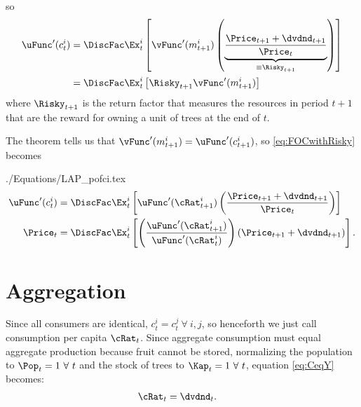 \documentclass{\handout}
\begin{document}
so\hypertarget{FOCwithRisky}{}
\begin{equation}\begin{gathered}\begin{aligned}
 \uFunc^{\prime}(c_{t}^{i}) & =  \DiscFac \Ex_{t}^{i}\left[\vFunc^{\prime}({m}_{t+1}^{i})\left(\underbrace{\frac{{\Price}_{t+1}+\dvdnd_{t+1}}{\Price_{t}}}_{\equiv \Risky_{t+1}}\right)\right] \label{eq:FOCwithRisky}
\\  & =  \DiscFac \Ex_{t}^{i}\left[\Risky_{t+1} \vFunc^{\prime}({m}_{t+1}^{i})\right] 
\end{aligned}\end{gathered}\end{equation}
where $\Risky_{t+1}$ is the return factor that measures the resources in period $t+1$ that are the reward for 
owning a unit of trees at the end of $t$.

\hypertarget{pofci}{}
The  theorem tells us that  $\vFunc^{\prime}({m}_{t+1}^{i})=\uFunc^{\prime}(c_{t+1}^{i})$, so \eqref{eq:FOCwithRisky} becomes 
\begin{verbatimwrite}{./Equations/LAP_pofci.tex}
\begin{equation}\begin{gathered}\begin{aligned}
\uFunc^{\prime}(c_{t}^{i}) & =  \DiscFac \Ex_{t}^{i}\left[\uFunc^{\prime}(\cRat_{t+1}^{i})\left(\frac{{\Price}_{t+1}+\dvdnd_{t+1}}{\Price_{t}}\right)\right]  
\\ \Price_{t} & =  \DiscFac \Ex_{t}^{i}
\left[
  \left(
    \frac{\uFunc^{\prime}(\cRat_{t+1}^{i})}{\uFunc^{\prime}(\cRat_{t}^{i})}
  \right)
  \left({\Price}_{t+1}+\dvdnd_{t+1}\right) \label{eq:pofci}
\right] .
\end{aligned}\end{gathered}\end{equation}
\end{verbatimwrite}

\section{Aggregation}

Since all consumers are identical, $c_{t}^{i} = c_{t}^{j}~\forall~i,j$, so henceforth we just call consumption per capita $\cRat_{t}$.  Since aggregate consumption must equal aggregate production because fruit cannot be stored, normalizing the population to $\Pop_{t}=1 ~\forall ~ t$ and the stock of trees to $\Kap_{t}=1 ~\forall~t$, equation \eqref{eq:CeqY} becomes:
\begin{equation}\begin{gathered}\begin{aligned}
\cRat_{t} & =  \dvdnd_{t}.
\end{aligned}\end{gathered}\end{equation}
\end{document}
